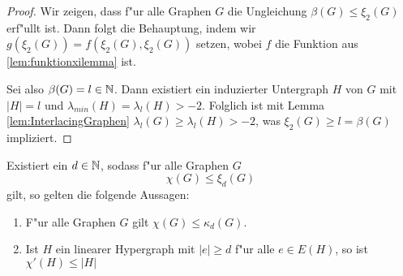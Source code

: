 \begin{proof}
  Wir zeigen, dass f"ur alle Graphen $G$ die Ungleichung $\beta(G) \leq \xi_{2}(G) $ erf"ullt ist. Dann folgt die Behauptung, indem wir $g(\xi_2(G))=f(\xi_2(G),\xi_2(G))$ setzen, wobei $f$ die Funktion aus \ref{lem:funktionxilemma} ist.

  Sei also $\beta(G) = l \in {\mathbb{N}}$. Dann existiert ein induzierter Untergraph $H$ von $G$ mit $|H| = l$ und $\lambda_{min}(H) = \lambda_{l}(H) > -2$. Folglich ist mit Lemma \ref{lem:InterlacingGraphen} $\lambda_l (G) \geq \lambda_{l}(H) > -2$, was $\xi_2(G) \geq l = \beta(G)$ impliziert.
\end{proof}

\begin{theorem}
  \label{thm:MainTheorem}
  Existiert ein $d\in {\mathbb{N}}$, sodass f"ur alle  Graphen $G$ $$\chi(G) \leq \xi_{d}(G)$$ gilt, so gelten die folgende Aussagen:
  \begin{enumerate}[label=\rm{(\alph*)}]
    \item F"ur alle Graphen $G$ gilt $\chi(G) \leq \kappa_d (G)$.
    \item  Ist $H$ ein linearer Hypergraph mit $\left|e\right| \geq d$ f"ur alle $e\in E(H)$, so ist $\chi'\left( H \right)\leq \left|H\right| $
  \end{enumerate}
\end{theorem}

